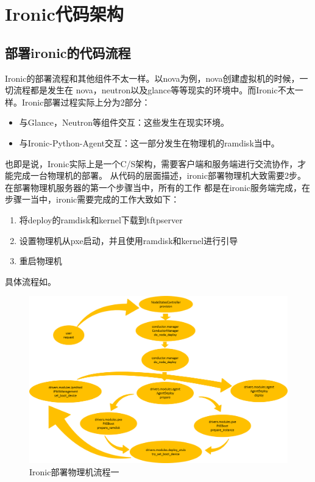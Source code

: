 \chapter{Ironic代码架构}

\section{部署ironic的代码流程}
Ironic的部署流程和其他组件不太一样。以nova为例，nova创建虚拟机的时候，一切流程都是发生在
nova，neutron以及glance等等现实的环境中。而Ironic不太一样。Ironic部署过程实际上分为2部分：
\begin{itemize}
  \item 与Glance，Neutron等组件交互：这些发生在现实环境。
  \item 与Ironic-Python-Agent交互：这一部分发生在物理机的ramdisk当中。
\end{itemize}
也即是说，Ironic实际上是一个C/S架构，需要客户端和服务端进行交流协作，才能完成一台物理机的部署。
从代码的层面描述，ironic部署物理机大致需要2步。在部署物理机服务器的第一个步骤当中，所有的工作
都是在ironic服务端完成，在步骤一当中，ironic需要完成的工作大致如下：
\begin{enumerate}
  \item 将deploy的ramdisk和kernel下载到tftpserver
  \item 设置物理机从pxe启动，并且使用ramdisk和kernel进行引导
  \item 重启物理机
\end{enumerate}

具体流程如。
\begin{figure}[H]
  \centering
  \includegraphics[scale=0.2]{ironic_workflow1.png}
  \caption{Ironic部署物理机流程一}
  \label{fig:step1}
\end{figure}

